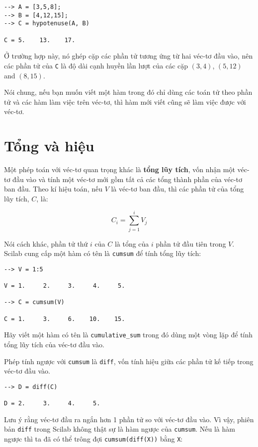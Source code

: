 \documentclass[12pt]{book}
\begin{document}
\begin{verbatim}
--> A = [3,5,8];
--> B = [4,12,15];
--> C = hypotenuse(A, B)

C = 5.    13.    17.
\end{verbatim}
Ở trường hợp này, nó ghép cặp các phần tử tương ứng từ hai
véc-tơ đầu vào, nên các phần tử của {\tt C} là độ dài cạnh huyền
lần lượt của các cặp $(3,4)$, $(5,12)$ and $(8,15)$.

Nói chung, nếu bạn muốn viết một hàm trong đó chỉ dùng các toán tử
theo phần tử và các hàm làm việc trên véc-tơ, thì hàm mới viết cũng
sẽ làm việc được với véc-tơ.


\section{Tổng và hiệu}

Một phép toán với véc-tơ quan trọng khác là {\bf tổng lũy tích}, vốn
nhận một véc-tơ đầu vào và tính một véc-tơ mới gồm tất cả các tổng
thành phần của véc-tơ ban đầu. Theo kí hiệu toán, nếu $V$ là véc-tơ
ban đầu, thì các phần tử của tổng lũy tích, $C$, là:

\[ C_i = \sum_{j=1}^i V_j \]

Nói cách khác, phần tử thứ $i$ của $C$ là tổng của 
$i$ phần tử đầu tiên trong $V$.  Scilab cung cấp một hàm có tên
là {\tt cumsum} để tính tổng lũy tích:

\begin{verbatim}
--> V = 1:5

V = 1.     2.     3.     4.     5.

--> C = cumsum(V)

C = 1.     3.     6.    10.    15.
\end{verbatim}
%
\begin{ex}
Hãy viết một hàm có tên là \verb#cumulative_sum# trong đó dùng
một vòng lặp để tính tổng lũy tích của véc-tơ đầu vào.
\end{ex}

Phép tính ngược với {\tt cumsum} là {\tt diff}, vốn tính hiệu giữa
các phần tử kế tiếp trong véc-tơ đầu vào.

\begin{verbatim}
--> D = diff(C)

D = 2.     3.     4.     5.
\end{verbatim}
%
Lưu ý rằng véc-tơ đầu ra ngắn hơn 1 phần tử so với véc-tơ đầu vào.
Vì vậy, phiên bản {\tt diff} trong Scilab không thật sự là hàm ngược
của {\tt cumsum}. Nếu là hàm ngược thì ta đã có thể trông đợi 
{\tt cumsum(diff(X))} bằng {\tt X}:
\end{document}
